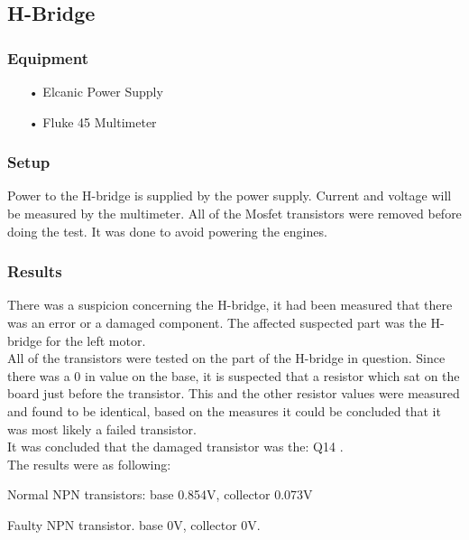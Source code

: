 \subsection{H-Bridge}

\subsubsection{Equipment}
\begin{enumerate}
	\item[•]Elcanic Power Supply
	\item[•]Fluke 45 Multimeter
\end{enumerate}

\subsubsection{Setup}
Power to the H-bridge is supplied by the power supply. Current and voltage will be measured by the multimeter.
All of the Mosfet transistors were removed before doing the test. It was done to avoid powering the engines.


\subsubsection{Results}
There was a suspicion concerning the H-bridge, it had been measured that there was an error or a damaged component. The affected suspected part was the H-bridge for the left motor.\\

All of the transistors were tested on the part of the H-bridge in question.
Since there was a 0 in value on the base, it is suspected that a resistor which sat on the board just before the transistor. This and the other resistor values were measured and found to be identical, based on the measures it could be concluded that it was most likely a failed transistor.\\

It was concluded that the damaged transistor was the: Q14 \cite{Q14}  
.\\

The results were as following:\

Normal NPN transistors: base 0.854V, collector 0.073V\

Faulty NPN transistor. base 0V, collector 0V.\\